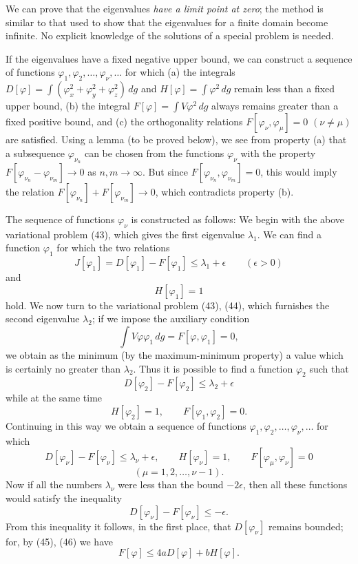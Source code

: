 We can prove that the eigenvalues \emph{have a limit point at zero}; the method is similar to that used to show that the eigenvalues for a finite domain become infinite. No explicit knowledge of the solutions of a special problem is needed.

If the eigenvalues have a fixed negative upper bound, we can construct a sequence of functions $\varphi_1,\varphi_2,\ldots,\varphi_\nu,\ldots$ for which (a) the integrals $D[\varphi]=\int(\varphi_x^2+\varphi_y^2+\varphi_z^2)\,dg$ and $H[\varphi]=\int\varphi^2\,dg$ remain less than a fixed upper bound, (b) the integral $F[\varphi]=\int V\varphi^2\,dg$ always remains greater than a fixed positive bound, and (c) the orthogonality relations $F[\varphi_\nu,\varphi_\mu]=0$ $(\nu\ne\mu)$ are satisfied. Using a lemma (to be proved below), we see from property (a) that a subsequence $\varphi_{\nu_n}$ can be chosen from the functions $\varphi_\nu$ with the property $F[\varphi_{\nu_n}-\varphi_{\nu_m}]\to0$ as $n,m\to\infty$. But since $F[\varphi_{\nu_n},\varphi_{\nu_m}]=0$, this would imply the relation $F[\varphi_{\nu_n}]+F[\varphi_{\nu_m}]\to0$, which contradicts property (b).

The sequence of functions $\varphi_\nu$ is constructed as follows: We begin with the above variational problem (43), which gives the first eigenvalue $\lambda_1$. We can find a function $\varphi_1$ for which the two relations
\[
J[\varphi_1]=D[\varphi_1]-F[\varphi_1]\le\lambda_1+\epsilon\qquad(\epsilon>0)
\]
and
\[
H[\varphi_1]=1
\]
hold. We now turn to the variational problem (43), (44), which furnishes the second eigenvalue $\lambda_2$; if we impose the auxiliary condition
\[
\int V\varphi\varphi_1\,dg=F[\varphi,\varphi_1]=0,
\]
we obtain as the minimum (by the maximum-minimum property) a value which is certainly no greater than $\lambda_2$. Thus it is possible to find a function $\varphi_2$ such that
\[
D[\varphi_2]-F[\varphi_2]\le\lambda_2+\epsilon
\]
while at the same time
\[
H[\varphi_2]=1,\qquad F[\varphi_1,\varphi_2]=0.
\]
Continuing in this way we obtain a sequence of functions $\varphi_1,\varphi_2,\ldots,\varphi_\nu,\ldots$ for which
\[
D[\varphi_\nu]-F[\varphi_\nu]\le\lambda_\nu+\epsilon,
\qquad H[\varphi_\nu]=1,
\qquad F[\varphi_\mu,\varphi_\nu]=0
\]
\[
(\mu=1,2,\ldots,\nu-1).
\]
Now if all the numbers $\lambda_\nu$ were less than the bound $-2\epsilon$, then all these functions would satisfy the inequality
\begin{equation}\tag{47}
D[\varphi_\nu]-F[\varphi_\nu]\le-\epsilon.
\end{equation}
From this inequality it follows, in the first place, that $D[\varphi_\nu]$ remains bounded; for, by (45), (46) we have
\[
F[\varphi]\le4aD[\varphi]+bH[\varphi].
\]

